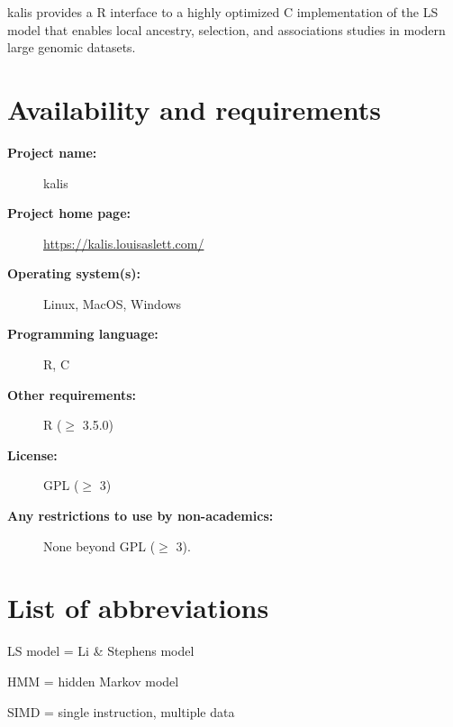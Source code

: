 \documentclass[pdflatex,referee,lineno,sn-nature]{sn-jnl}%
\let\proglang=\textsf
\newcommand{\pkg}[1]{{\fontseries{m}\fontseries{b}\selectfont #1}}
\begin{document}
\pkg{kalis} provides a \proglang{R} interface to a highly optimized \proglang{C} implementation of the LS model that enables local ancestry, selection, and associations studies in modern large genomic datasets.



\section*{Availability and requirements}

\begin{description}
	\item[\textbf{Project name:}] \pkg{kalis}
	\item[\textbf{Project home page:}] \url{https://kalis.louisaslett.com/}
	\item[\textbf{Operating system(s):}] Linux, MacOS, Windows
	\item[\textbf{Programming language:}] \proglang{R}, \proglang{C}
	\item[\textbf{Other requirements:}] R ($\geq$ 3.5.0)
	\item[\textbf{License:}] GPL ($\geq$ 3)
	\item[\textbf{Any restrictions to use by non-academics:}] None beyond GPL ($\geq$ 3).
\end{description}



\section*{List of abbreviations}

\noindent
LS model = Li \& Stephens model

\noindent
HMM = hidden Markov model

\noindent
SIMD = single instruction, multiple data



\backmatter

\end{document}

